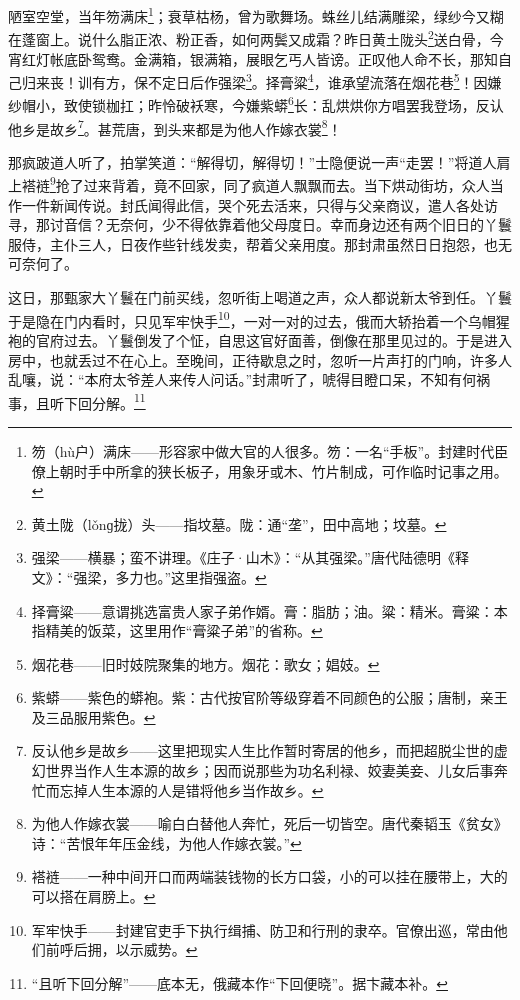 \par 陋室空堂，当年笏满床\footnote{笏（hù户）满床——形容家中做大官的人很多。笏：一名“手板”。封建时代臣僚上朝时手中所拿的狭长板子，用象牙或木、竹片制成，可作临时记事之用。}；衰草枯杨，曾为歌舞场。蛛丝儿结满雕梁，绿纱今又糊在蓬窗上。说什么脂正浓、粉正香，如何两鬓又成霜？昨日黄土陇头\footnote{黄土陇（lǒnɡ拢）头——指坟墓。陇：通“垄”，田中高地；坟墓。}送白骨，今宵红灯帐底卧鸳鸯。金满箱，银满箱，展眼乞丐人皆谤。正叹他人命不长，那知自己归来丧！训有方，保不定日后作强梁\footnote{强梁——横暴；蛮不讲理。《庄子·山木》：“从其强梁。”唐代陆德明《释文》：“强梁，多力也。”这里指强盗。}。择膏粱\footnote{择膏粱——意谓挑选富贵人家子弟作婿。膏：脂肪；油。粱：精米。膏粱：本指精美的饭菜，这里用作“膏粱子弟”的省称。}，谁承望流落在烟花巷\footnote{烟花巷——旧时妓院聚集的地方。烟花：歌女；娼妓。}！因嫌纱帽小，致使锁枷扛；昨怜破袄寒，今嫌紫蟒\footnote{紫蟒——紫色的蟒袍。紫：古代按官阶等级穿着不同颜色的公服；唐制，亲王及三品服用紫色。}长：乱烘烘你方唱罢我登场，反认他乡是故乡\footnote{反认他乡是故乡——这里把现实人生比作暂时寄居的他乡，而把超脱尘世的虚幻世界当作人生本源的故乡；因而说那些为功名利禄、姣妻美妾、儿女后事奔忙而忘掉人生本源的人是错将他乡当作故乡。}。甚荒唐，到头来都是为他人作嫁衣裳\footnote{为他人作嫁衣裳——喻白白替他人奔忙，死后一切皆空。唐代秦韬玉《贫女》诗：“苦恨年年压金线，为他人作嫁衣裳。”}！
\par 那疯跛道人听了，拍掌笑道：“解得切，解得切！”士隐便说一声“走罢！”将道人肩上褡裢\footnote{褡裢——一种中间开口而两端装钱物的长方口袋，小的可以挂在腰带上，大的可以搭在肩膀上。}抢了过来背着，竟不回家，同了疯道人飘飘而去。当下烘动街坊，众人当作一件新闻传说。封氏闻得此信，哭个死去活来，只得与父亲商议，遣人各处访寻，那讨音信？无奈何，少不得依靠着他父母度日。幸而身边还有两个旧日的丫鬟服侍，主仆三人，日夜作些针线发卖，帮着父亲用度。那封肃虽然日日抱怨，也无可奈何了。
\par 这日，那甄家大丫鬟在门前买线，忽听街上喝道之声，众人都说新太爷到任。丫鬟于是隐在门内看时，只见军牢快手\footnote{军牢快手——封建官吏手下执行缉捕、防卫和行刑的隶卒。官僚出巡，常由他们前呼后拥，以示威势。}，一对一对的过去，俄而大轿抬着一个乌帽猩袍的官府过去。丫鬟倒发了个怔，自思这官好面善，倒像在那里见过的。于是进入房中，也就丢过不在心上。至晚间，正待歇息之时，忽听一片声打的门响，许多人乱嚷，说：“本府太爷差人来传人问话。”封肃听了，唬得目瞪口呆，不知有何祸事，且听下回分解。\footnote{“且听下回分解”——底本无，俄藏本作“下回便晓”。据卞藏本补。}



\clearpage
